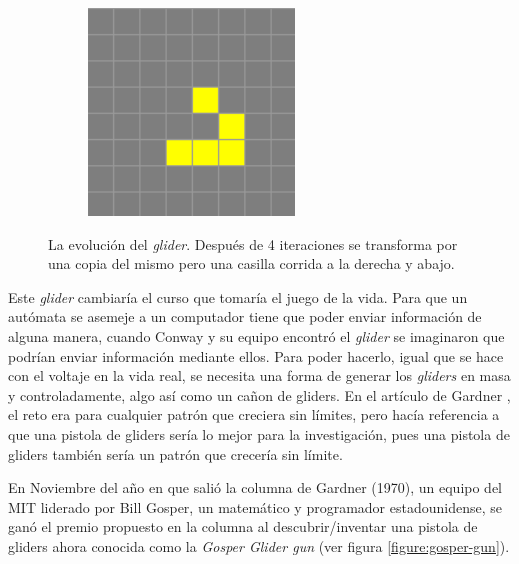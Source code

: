 \begin{figure}[b]
\begin{subfigure}{0.15\textwidth}
    \end{subfigure}
    \begin{subfigure}{0.15\textwidth}
        \includegraphics[width=\textwidth]{images/life-glider-5.png}
    \end{subfigure}
    \caption{La evoluci\'on del \textit{glider}. Despu\'es de 4 iteraciones se transforma por una copia del mismo pero una casilla corrida a la derecha y abajo.}
\end{figure}

Este \textit{glider} cambiar\'ia el curso que tomar\'ia el juego de la vida. Para que un aut\'omata se asemeje a un computador tiene que poder enviar informaci\'on de alguna manera, cuando Conway y su equipo encontr\'o el \textit{glider} se imaginaron que podr\'ian enviar informaci\'on mediante ellos. Para poder hacerlo, igual que se hace con el voltaje en la vida real, se necesita una forma de generar los \textit{gliders} en masa y controladamente, algo as\'i como un ca\~non de gliders. En el art\'iculo de Gardner \cite{Gardner1970}, el reto era para cualquier patr\'on que creciera sin l\'imites, pero hac\'ia referencia a que una pistola de gliders ser\'ia lo mejor para la investigaci\'on, pues una pistola de gliders tambi\'en ser\'ia un patr\'on que crecer\'ia sin l\'imite.

En Noviembre del a\~no en que sali\'o la columna de Gardner (1970), un equipo del MIT liderado por Bill Gosper, un matem\'atico y programador estadounidense, se gan\'o el premio propuesto en la columna al descubrir/inventar una pistola de gliders ahora conocida como la \textit{Gosper Glider gun} (ver figura \ref{figure:gosper-gun}). 

